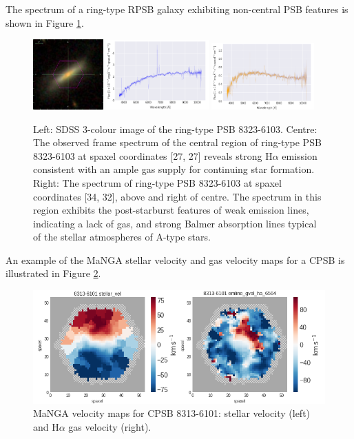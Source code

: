 The spectrum of a ring-type RPSB galaxy exhibiting non-central PSB features is shown in Figure \ref{fig:RPSB-8323-6103-spec}.
\begin{figure}
    \centering
    \includegraphics[width=0.24\textwidth]{images/Cutouts/RPSB-8323-6103-IM.png}
    \hfill
    \includegraphics[width=0.35\textwidth]{images/Spectra/RPSB-8323-6103-27-27.png}
    \hfill
    \includegraphics[width=0.35\textwidth]{images/Spectra/RPSB-8323-6103-34-32.png}
    \caption{Left: SDSS 3-colour image of the ring-type PSB 8323-6103. 
    Centre: The observed frame spectrum of the central region of ring-type PSB 8323-6103 at spaxel coordinates [27, 27] reveals strong H$\alpha$ emission consistent with an ample gas supply for continuing star formation.
    Right: The spectrum of ring-type PSB 8323-6103 at spaxel coordinates [34, 32], above and right of centre. The spectrum in this region exhibits the post-starburst features of weak emission lines, indicating a lack of gas, and strong Balmer absorption lines typical of the stellar atmospheres of A-type stars.}
    \label{fig:RPSB-8323-6103-spec}
\end{figure}

An example of the MaNGA stellar velocity and gas velocity maps for a CPSB is illustrated in Figure \ref{fig:CPSB-8313-6101-VMAPS}.

\begin{figure}
    \centering
\includegraphics[width=\columnwidth]{images/VelocityMaps/CPSB-8313-6101-VMAPS.png}
    \caption{MaNGA velocity maps for CPSB 8313-6101: stellar velocity (left) and H$\alpha$ gas velocity (right).}
    \label{fig:CPSB-8313-6101-VMAPS}
\end{figure}

